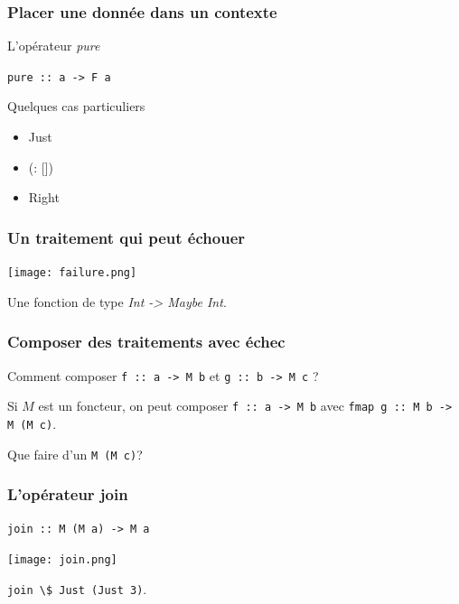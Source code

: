 \documentclass{beamer}
\begin{document}
\begin{frame}
\frametitle{Placer une donnée dans un contexte}

\begin{block}{L'opérateur \emph{pure}}
\begin{center}
\verb!pure :: a -> F a!
\end{center}
\end{block}

\begin{exampleblock}{Quelques cas particuliers}
	\begin{itemize}
		\item Just
		\item (: [])
		\item Right
	\end{itemize}
\end{exampleblock}
\end{frame}


\begin{frame}
\frametitle{Un traitement qui peut échouer}

\begin{center}
\texttt{[image: failure.png]}
\end{center}
\begin{exampleblock}{}
Une fonction de type \emph{Int -> Maybe Int}.
\end{exampleblock}
\end{frame}

\begin{frame}
\frametitle{Composer des traitements avec échec}
\begin{block}{}
Comment composer \verb!f :: a -> M b! et \verb!g :: b -> M c! ?
\end{block}
\pause
\begin{block}{}
Si $M$ est un foncteur, on peut composer
\verb!f :: a -> M b! avec \verb!fmap g :: M b -> M (M c)!.
\end{block}
\pause
\begin{block}{}
Que faire d'un \verb!M (M c)!?
\end{block}

\end{frame}

\begin{frame}
\frametitle{L'opérateur join}
\begin{block}{}
\begin{center}
\verb!join :: M (M a) -> M a!
\end{center}
\end{block}

\begin{center}
\texttt{[image: join.png]}
\end{center}
\pause
\begin{exampleblock}{}
\begin{center}
\verb!join \$ Just (Just 3)!.
\end{center}
\end{exampleblock}
\end{frame}
\end{document}
